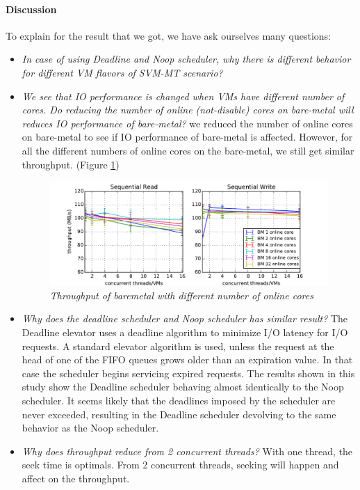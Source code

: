 \documentclass{acmsig}
\begin{document}
\paragraph{Discussion}
To explain for the result that we got, we have ask ourselves many questions:
\begin{itemize}
 \item \textit{In case of using Deadline and Noop scheduler, why there is different behavior for different VM flavors of SVM-MT scenario?}
 \item \textit{We see that IO performance is changed when VMs have different number of cores. Do reducing the number of online (not-disable) cores on bare-metal will reduces IO performance of bare-metal?} we reduced the number of online cores on bare-metal to see if IO performance of bare-metal is affected. However, for all the different numbers of online cores on the bare-metal, we still get similar throughput. (Figure \ref{fig:throughputbmdiffonlinecore})
     \begin{figure}[t]
      \centering
      \includegraphics[scale=0.7]{figures/throughput_cfq_bmdiffonlinecore.pdf}
      \caption{\textit{Throughput of baremetal with different number of online cores}}
      \label{fig:throughputbmdiffonlinecore}
     \end{figure}
 \item \textit{Why does the deadline scheduler and Noop scheduler has similar result?} The Deadline elevator uses a deadline algorithm to minimize I/O latency for I/O requests. A standard elevator algorithm is used, unless the request at the head of one of the FIFO queues grows older than an expiration value. In that case the scheduler begins servicing expired requests. The results shown in this study show the Deadline scheduler behaving almost identically to the Noop scheduler. It seems likely that the deadlines imposed by the scheduler are never exceeded, resulting in the Deadline scheduler devolving to the same behavior as the Noop scheduler.
 \item \textit{Why does throughput reduce from 2 concurrent threads?} With one thread, the seek time is optimals. From 2 concurrent threads, seeking will happen and affect on the throughput.

\end{itemize}
\end{document}
